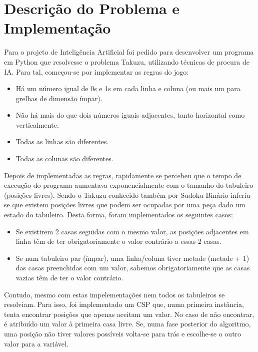 \documentclass[12pt,a4paper]{article}
\begin{document}
  \section{Descrição do Problema e Implementação}

  Para o projeto de Inteligência Artificial foi pedido para desenvolver um programa em Python que resolvesse o problema Takuzu, utilizando técnicas de procura de IA.
  Para tal, começou-se por implementar as regras do jogo:

  \begin{itemize}
    \setlength{\itemsep}{0pt}
    \item Há um número igual de 0s e 1s em cada linha e coluna (ou mais um para grelhas de
    dimensão ímpar).
    \item Não há mais do que dois números iguais adjacentes, tanto horizontal como verticalmente.
    \item Todas as linhas são diferentes.
    \item Todas as colunas são diferentes.
  \end{itemize}

  Depois de implementadas as regras, rapidamente se percebeu que o tempo de execução do programa aumentava exponencialmente com o tamanho do tabuleiro (posições livres).
  Sendo o Takuzu conhecido também por Sudoku Binário inferiu-se que existem posições livres que podem ser ocupadas por uma peça dado um estado do tabuleiro. 
  Desta forma, foram implementados os seguintes casos:
  \begin{itemize}
    \setlength{\itemsep}{0pt}
    \item Se existirem 2 casas seguidas com o mesmo valor, as posições adjacentes em linha têm de ter obrigatoriamente o valor contrário a essas 2 casas.
    \item Se num tabuleiro par (ímpar), uma linha/coluna tiver metade (metade + 1) das casas preenchidas com um valor, sabemos obrigatoriamente que as casas vazias têm de ter o valor contrário. 
  \end{itemize}

  Contudo, mesmo com estas impelementações nem todos os tabuleiros se resolviam.
  Para isso, foi implementado um CSP que, numa primeira instância, tenta encontrar posições que apenas aceitam um valor.
  No caso de não encontrar, é atribuído um valor à primeira casa livre.
  Se, numa fase posterior do algoritmo, uma posição não tiver valores possíveis volta-se para trás e escolhe-se o outro valor para a variável.
\end{document}
